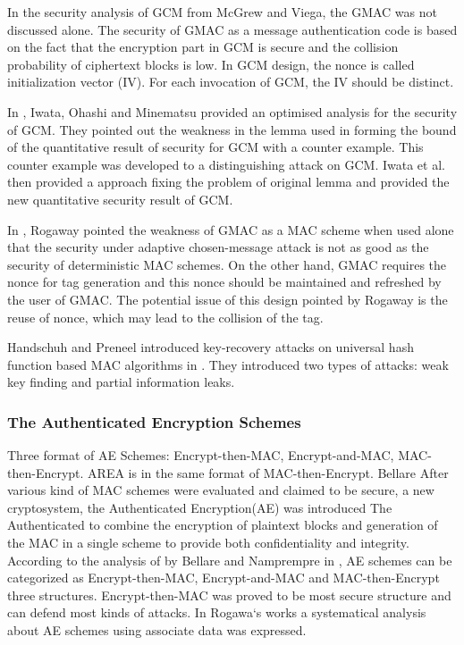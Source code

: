 \documentclass{article}
\begin{document}
In the security analysis of GCM from McGrew and Viega, the GMAC was not discussed alone. The security of GMAC as a message authentication code is based on the fact that the encryption part in GCM is secure and the collision probability of ciphertext blocks is low. 
In GCM design, the nonce is called initialization vector (IV). For each invocation of GCM, the IV should be distinct.

In \cite{breaking}, Iwata, Ohashi and Minematsu provided an optimised analysis for the security of GCM. They pointed out the weakness in the lemma used in forming the bound of the quantitative result of security for GCM with a counter example. This counter example was developed to a distinguishing attack on GCM. Iwata et al. then provided a approach fixing the problem of original lemma and provided the new quantitative security result of GCM. 

In \cite{Rogaway2011}, Rogaway pointed the weakness of GMAC as a MAC scheme when used alone that the security under adaptive chosen-message attack is not as good as the security of deterministic MAC schemes. On the other hand, GMAC requires the nonce for tag generation and this nonce should be maintained and refreshed by the user of GMAC. The potential issue of this design pointed by Rogaway is the reuse of nonce, which may lead to the collision of the tag. 

Handschuh and Preneel introduced key-recovery attacks on universal hash function based MAC algorithms in \cite{key_recover}. They introduced two types of attacks: weak key finding and partial information leaks.

\subsubsection{The Authenticated Encryption Schemes}
Three format of AE Schemes: Encrypt-then-MAC, Encrypt-and-MAC, MAC-then-Encrypt. AREA is in the same format of MAC-then-Encrypt. 
Bellare 
After various kind of MAC schemes were evaluated and claimed to be secure, a new cryptosystem, the Authenticated Encryption(AE) was introduced The Authenticated to combine the encryption of
plaintext blocks and generation of the MAC in a single scheme to provide both
confidentiality and integrity. According to the analysis of by Bellare and Namprempre in \cite{ae-notion}, AE schemes can be categorized as Encrypt-then-MAC, Encrypt-and-MAC and MAC-then-Encrypt three structures. Encrypt-then-MAC was proved to be most secure structure and can defend most kinds of attacks. 
In Rogawa`s works \cite{aead} a systematical analysis about AE
schemes using associate data was expressed.  
\end{document}
